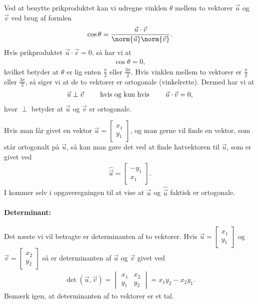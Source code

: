 Ved at benytte prikproduktet kan vi udregne vinklen $\theta$ mellem to vektorer $\vec{u}$ og $\vec{v}$ ved brug af formlen 
\begin{align}\label{eq:vec2d1vinkelvedprikprodukt}
\cos \theta = \frac{\vec{u} \cdot \vec{v}}{\norm{\vec{u}} \norm{\vec{v}}}.
\end{align}
Hvis prikproduktet $\vec{u} \cdot \vec{v}=0$, så har vi at 
\begin{align*}
\cos \theta = 0,
\end{align*}
hvilket betyder at $\theta$ er lig enten $\frac{\pi}{2}$ eller $\frac{3\pi}{2}$. Hvis vinklen mellem to vektorer er $\frac{\pi}{2}$ eller $\frac{3\pi}{2}$, så siger vi at de to vektorer er ortogonale (vinkelrette). Dermed har vi at 
\begin{align*}
\vec{u} \perp \vec{v} \qquad \textup{ hvis og kun hvis } \qquad \vec{u} \cdot \vec{v} = 0,
\end{align*}
hvor $\perp$ betyder at $\vec{u}$ og $\vec{v}$ er ortogonale.

Hvis man får givet en vektor $\vec{u} = \begin{bmatrix} x_1 \\ y_1 \end{bmatrix}$, og man gerne vil finde en vektor, som står ortogonalt på $\vec{u}$, så kan man gøre det ved at finde hatvektoren til $\vec{u}$, som er givet ved
\begin{align*}
\widehat{\vec{u}} = \begin{bmatrix}
-y_1 \\
x_1
\end{bmatrix}.
\end{align*}
I kommer selv i opgaveregningen til at vise at $\vec{u}$ og $\widehat{\vec{u}}$ faktisk er ortogonale.

\paragraph*{Determinant:}
Det næste vi vil betragte er determinanten af to vektorer. Hvis $\vec{u} = \begin{bmatrix} x_1 \\ y_1 \end{bmatrix}$ og $\vec{v} = \begin{bmatrix} x_2 \\ y_2 \end{bmatrix}$ så er determinanten af $\vec{u}$ og $\vec{v}$ givet ved
\begin{align}\label{eq:vec2d1determinant}
\det (\vec{u},\vec{v}) = \begin{vmatrix}
x_1 & x_2 \\
y_1 & y_2
\end{vmatrix}
=
x_1y_2 - x_2y_1.
\end{align}
Bemærk igen, at determinanten af to vektorer er et tal.

